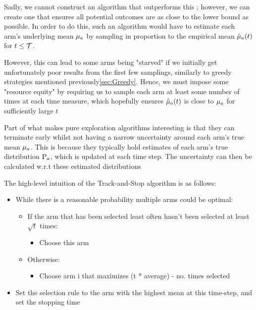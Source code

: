 
Sadly, we cannot construct an algorithm that outperforms this ; however, we can create one that ensures all potential outcomes are as close to the lower bound as possible. In order to do this, such an algorithm would have to estimate each arm's underlying mean $\mu_{a}$ by sampling in proportion to the empirical mean $\hat{\mu}_{a}(t)$ for $t \leq \mathcal{T}$.

However, this can lead to some arms being "starved" if we initially get unfortunately poor results from the first few samplings, similarly to greedy strategies mentioned previously\ref{sec:Greedy}. Hence, we must impose some "resource equity" by requiring us to sample each arm at least some number of times at each time measure, which hopefully ensures $\hat{\mu}_{a}(t)$ is close to $\mu_{a}$ for sufficiently large $t$


Part of what makes pure exploration algorithms interesting is that they can terminate early whilst not having a narrow uncertainty around each arm's true mean $\mu_{a}$. This is because they typically hold estimates of each arm's true distribution $\mathrm{P}_{a}$, which is updated at each time step. The uncertainty can then be calculated w.r.t these estimated distributions 

The high-level intuition of the Track-and-Stop algorithm is as follows:

\begin{itemize}
    \item While there is a reasonable probability multiple arms could be optimal:
    \begin{itemize}
        \item If the arm that has been selected least often hasn't been selected at least $\sqrt{t}$ times:
        \begin{itemize}
            \item Choose this arm
        \end{itemize}
        \item Otherwise:
        \begin{itemize}
            \item Choose arm i that maximizes (t * average) - no. times selected
        \end{itemize}
    \end{itemize}
    \item Set the selection rule to the arm with the highest mean at this time-step, and set the stopping time
\end{itemize}

